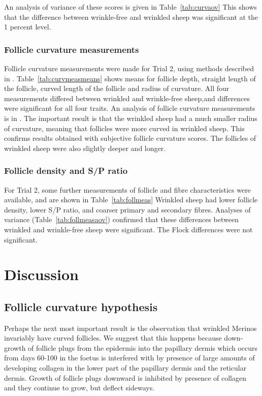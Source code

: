 \documentclass{article}
\begin{document}
An analysis of variance of these scores is given in Table~\ref{tab:curvaov}
%
This shows that the difference between wrinkle-free and wrinkled sheep was significant at the 1 percent level.

\subsubsection{Follicle curvature measurements}
Follicle curvature measurements were made for Trial 2, using methods described in \cite{watts-2018}.  Table~\ref{tab:curvmeasmeans} shows means for follicle depth, straight length of the follicle, curved length of the follicle and radius of curvature. 
%
All four measurements differed between wrinkled and wrinkle-free sheep,and differences were significant for all four traits.  An analysis of follicle curvature measurements is in \cite{watts-2018}. 
The important result is that the wrinkled sheep had a much smaller radius of curvature, meaning that follicles were more curved in wrinkled sheep. This confirms results obtained with subjective follicle curvature scores.  The follicles of wrinkled sheep were also slightly deeper and longer. 

\subsubsection{Follicle density and S/P ratio}
For Trial 2, some further measurements of follicle and fibre characteristics were available, and are shown in Table~\ref{tab:follmeas}
%
Wrinkled sheep had lower follicle density, lower S/P ratio, and coarser primary and secondary fibres.  Analyses of variance (Table~\ref{tab:follmeasaov}) confirmed that these differences between wrinkled and wrinkle-free sheep were significant. The Flock differences were not significant.
%


\section{Discussion}
 
\subsection{Follicle curvature hypothesis}
Perhaps the next most important result is the observation that wrinkled Merinos invariably have curved follicles. We suggest that this happens because down-growth of follicle plugs from the epidermis into the papillary dermis which occurs from days 60-100 in the foetus is interfered with by presence of large amounts of developing collagen in the lower part of the papillary dermis and the reticular dermis. Growth of follicle plugs downward is inhibited by presence of collagen and they continue to grow, but deflect sideways.
\end{document}
